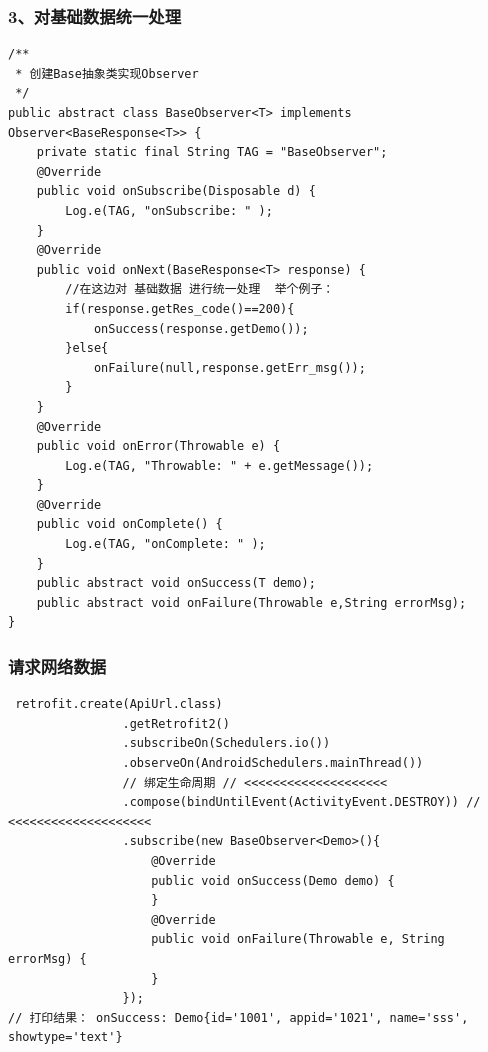 \documentclass[9pt, b5paper]{article}
\begin{document}
\subsubsection{3、对基础数据统一处理}
\label{sec-18-1-3}
\begin{verbatim}
/**
 * 创建Base抽象类实现Observer
 */
public abstract class BaseObserver<T> implements Observer<BaseResponse<T>> {
    private static final String TAG = "BaseObserver";
    @Override
    public void onSubscribe(Disposable d) {
        Log.e(TAG, "onSubscribe: " );
    }
    @Override
    public void onNext(BaseResponse<T> response) {
        //在这边对 基础数据 进行统一处理  举个例子：
        if(response.getRes_code()==200){
            onSuccess(response.getDemo());
        }else{
            onFailure(null,response.getErr_msg());
        }
    }
    @Override
    public void onError(Throwable e) {
        Log.e(TAG, "Throwable: " + e.getMessage());
    }
    @Override
    public void onComplete() {
        Log.e(TAG, "onComplete: " );
    }
    public abstract void onSuccess(T demo);
    public abstract void onFailure(Throwable e,String errorMsg);
}
\end{verbatim}
\subsubsection{请求网络数据}
\label{sec-18-1-4}
\begin{verbatim}
 retrofit.create(ApiUrl.class)
                .getRetrofit2()
                .subscribeOn(Schedulers.io())
                .observeOn(AndroidSchedulers.mainThread())
                // 绑定生命周期 // <<<<<<<<<<<<<<<<<<<< 
                .compose(bindUntilEvent(ActivityEvent.DESTROY)) // <<<<<<<<<<<<<<<<<<<< 
                .subscribe(new BaseObserver<Demo>(){
                    @Override
                    public void onSuccess(Demo demo) {
                    }
                    @Override
                    public void onFailure(Throwable e, String errorMsg) {
                    }
                });
// 打印结果： onSuccess: Demo{id='1001', appid='1021', name='sss', showtype='text'}
\end{verbatim}
\end{document}
